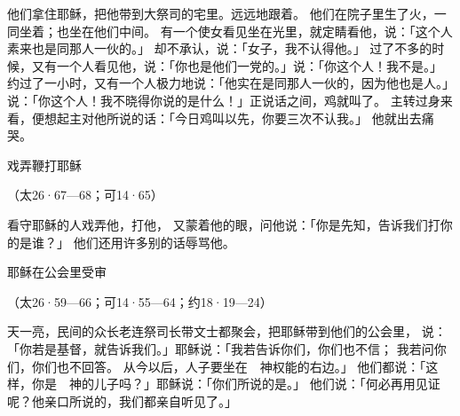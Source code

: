 {\par }{\PP {}他们拿住耶稣，把他带到大祭司的宅里。{}远远地跟着。
他们在院子里生了火，一同坐着；{}也坐在他们中间。
有一个使女看见{}坐在{}光里，就定睛看他，说：「这个人素来也是同那人一伙的。」
却不承认，说：「女子，我不认得他。」
过了不多的时候，又有一个人看见他，说：「你也是他们一党的。」{}说：「你这个人！我不是。」
约过了一小时，又有一个人极力地说：「他实在是同那人一伙的，因为他也是{}人。」
说：「你这个人！我不晓得你说的是什么！」正说话之间，鸡就叫了。
主转过身来看{}，{}便想起主对他所说的话：「今日鸡叫以先，你要三次不认我。」
他就出去痛哭。
\par }{\SH 戏弄鞭打耶稣
\par }{\R （太26·67—68；可14·65）
\par }{\PP {}看守耶稣的人戏弄他，打他，
又蒙着他的眼，问他说：「你是先知，告诉我们打你的是谁？」
他们还用许多别的话辱骂他。
\par }{\SH 耶稣在公会里受审
\par }{\R （太26·59—66；可14·55—64；约18·19—24）
\par }{\PP {}天一亮，民间的众长老连祭司长带文士都聚会，把耶稣带到他们的公会里，
说：「你若是基督，就告诉我们。」耶稣说：「我若告诉你们，你们也不信；
我若问你们，你们也不回答。
从今以后，人子要坐在　神权能的右边。」
他们都说：「这样，你是　神的儿子吗？」耶稣说：「你们所说的是。」
他们说：「何必再用见证呢？他亲口所说的，我们都亲自听见了。」

}

